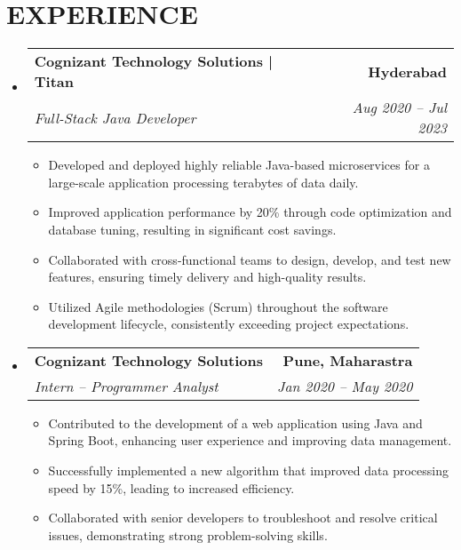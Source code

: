 \documentclass[letterpaper,11pt]{article}
\makeatletter
\newcommand{\resumeItem}[1]{\item\small{{#1 \vspace{-3pt}}}}
\newcommand{\resumeSubheading}[4]{\vspace{-2pt}\item\begin{tabular*}{0.97\textwidth}[t]{l@{\extracolsep{\fill}}r}\textbf{#1} & #2 \\ \textit{\small#3} & \textit{\small #4} \\ \end{tabular*}\vspace{-7pt}}
\newcommand{\resumeSubHeadingListStart}{\begin{itemize}[leftmargin=0.15in, label={}]}
\newcommand{\resumeSubHeadingListEnd}{\end{itemize}}
\newcommand{\resumeItemListStart}{\begin{itemize}}
\newcommand{\resumeItemListEnd}{\end{itemize}\vspace{-5pt}}
\makeatother
\begin{document}
\section{{\fontsize{9pt}{20pt}\selectfont \textbf{EXPERIENCE}}}\resumeSubHeadingListStart
\resumeSubheading{Cognizant Technology Solutions | Titan}{\textbf{Hyderabad}}{Full-Stack Java Developer}{Aug 2020 – Jul 2023}
\resumeItemListStart
\resumeItem{Developed and deployed highly reliable Java-based microservices for a large-scale application processing terabytes of data daily.}
\resumeItem{Improved application performance by 20\% through code optimization and database tuning, resulting in significant cost savings.}
\resumeItem{Collaborated with cross-functional teams to design, develop, and test new features, ensuring timely delivery and high-quality results.}
\resumeItem{Utilized Agile methodologies (Scrum) throughout the software development lifecycle, consistently exceeding project expectations.}
\resumeItemListEnd
\resumeSubheading{Cognizant Technology Solutions}{\textbf{Pune, Maharastra}}{Intern – Programmer Analyst}{Jan 2020 – May 2020}
\resumeItemListStart
\resumeItem{Contributed to the development of a web application using Java and Spring Boot, enhancing user experience and improving data management.}
\resumeItem{Successfully implemented a new algorithm that improved data processing speed by 15\%, leading to increased efficiency.}
\resumeItem{Collaborated with senior developers to troubleshoot and resolve critical issues, demonstrating strong problem-solving skills.}
\resumeItemListEnd
\resumeSubHeadingListEnd\vspace{-17pt}
\end{document}
